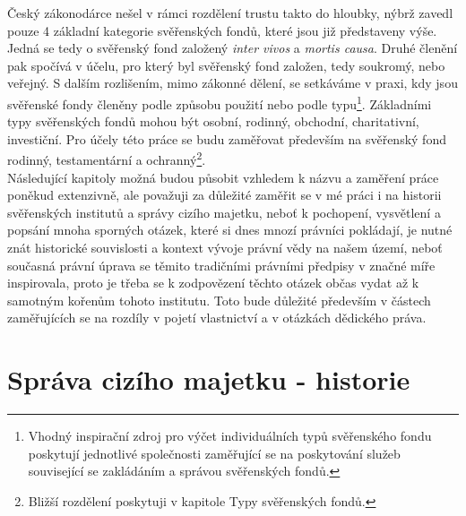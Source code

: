 \documentclass{article}
\newif\ifcomment
\begin{document}
Český zákonodárce nešel v rámci rozdělení trustu takto do hloubky, nýbrž zavedl pouze 4 základní kategorie svěřenských fondů, které jsou již představeny výše. Jedná se tedy o svěřenský fond založený \textit{inter vivos} a \textit{mortis causa}. Druhé členění pak spočívá v účelu, pro který byl svěřenský fond založen, tedy soukromý, nebo veřejný. S dalším rozlišením, mimo zákonné dělení, se setkáv\-áme v praxi, kdy jsou svěřenské fondy členěny podle způsobu použití nebo podle typu\footnote{Vhodný inspirační zdroj pro výčet individuálních typů svěřenského fondu poskytují jednotlivé společnosti zaměřující se na poskytování služeb související se zakládáním a správou svěřenských fondů.}. Základními typy svěřenských fondů mohou být osobní, rodinný, obchodní, charitativní, investiční. Pro účely této práce se budu zaměřovat především na svěřenský fond rodinný, testamentární a ochranný\footnote{Bližší rozdělení poskytuji v kapitole Typy svěřenských fondů.}.\\

Následující kapitoly možná budou působit vzhledem k názvu a zaměření práce poněkud extenzivně, ale považuji za důležité zaměřit se v mé práci i na historii svěřenských institutů a správy cizího majetku, neboť k pochopení, vysvětlení a popsání mnoha sporných otázek, které si dnes mnozí právníci pokládají, je nutné znát historické souvislosti a kontext vývoje právní vědy na našem území, neboť současná právní úprava se těmito tradičními právními předpisy v značné míře inspirovala, proto je třeba se k zodpovězení těchto otázek občas vydat až k samotným kořenům tohoto institutu. Toto bude důležité především v částech zaměřujících se na rozdíly v pojetí vlastnictví a v otázkách dědického práva.\\


\newpage



\section{Správa cizího majetku - historie}
\end{document}
